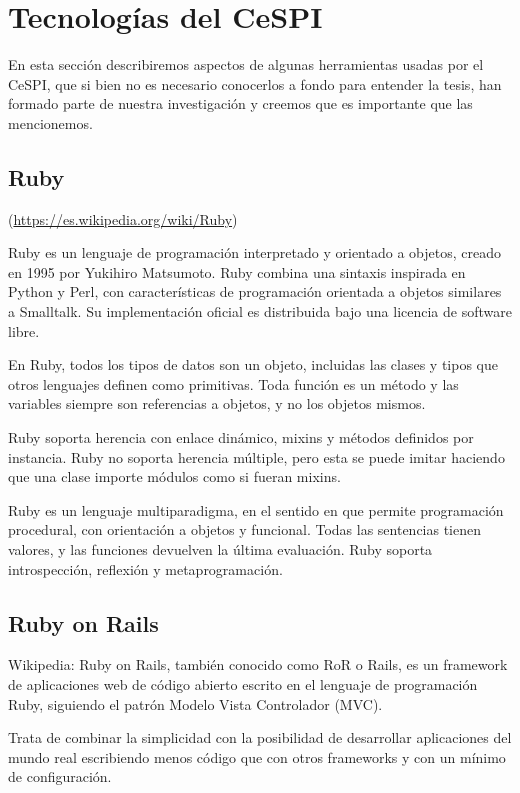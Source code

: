 \section{Tecnologías del CeSPI}
\label{anexo:A}

En esta sección describiremos aspectos de algunas herramientas usadas por el
CeSPI, que si bien no es necesario conocerlos a fondo para entender la tesis,
han formado parte de nuestra investigación y creemos que es importante que las
mencionemos.

\subsection{Ruby}
(\url{https://es.wikipedia.org/wiki/Ruby})

Ruby es un lenguaje de programación interpretado y orientado a objetos, creado
en 1995 por Yukihiro Matsumoto. Ruby combina una sintaxis inspirada en Python y
Perl, con características de programación orientada a objetos similares a
Smalltalk. Su implementación oficial es distribuida bajo una licencia de
software libre.

En Ruby, todos los tipos de datos son un objeto, incluidas las clases y tipos
que otros lenguajes definen como primitivas. Toda función es un método y las
variables siempre son referencias a objetos, y no los objetos mismos.

Ruby soporta herencia con enlace dinámico, mixins y métodos definidos por
instancia. Ruby no soporta herencia múltiple, pero esta se puede imitar
haciendo que una clase importe módulos como si fueran mixins. 

Ruby es un lenguaje multiparadigma, en el sentido en que permite programación
procedural, con orientación a objetos y funcional. Todas las sentencias tienen
valores, y las funciones devuelven la última evaluación. Ruby soporta
introspección, reflexión y metaprogramación.

\subsection{Ruby on Rails}

Wikipedia:
Ruby on Rails, también conocido como RoR o Rails, es un framework de
aplicaciones web de código abierto escrito en el lenguaje de programación Ruby,
siguiendo el patrón Modelo Vista Controlador (MVC).

Trata de combinar la simplicidad con la posibilidad de desarrollar aplicaciones
del mundo real escribiendo menos código que con otros frameworks y con un
mínimo de configuración.

